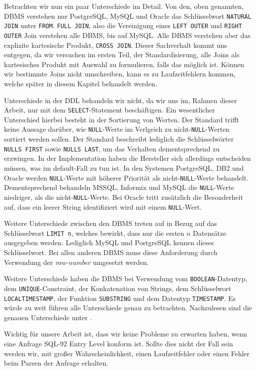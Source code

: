 Betrachten wir nun ein paar Unterschiede im Detail. Von den, oben genannten, DBMS verstehen nur PostgreSQL, MySQL und Oracle das Schlüsselwort \verb|NATURAL JOIN| unter \verb|FROM|. \verb|FULL JOIN|, also die Vereinigung eines \verb|LEFT OUTER| und \verb|RIGHT OUTER| Join verstehen alle DBMS, bis auf MySQL. Alle DBMS verstehen aber das explizite kartesische  Produkt, \verb|CROSS JOIN|. Dieser Sachverhalt kommt uns entgegen, da wir versuchen im ersten Teil, der Standardisierung, alle Joins als kartesisches Produkt mit Auswahl zu formulieren, falls das möglich ist. Können wir bestimmte Joins nicht umschreiben, kann es zu Laufzeitfehlern kommen, welche später in diesem Kapitel behandelt werden.

Unterschiede in der DDL behandeln wir nicht, da wir uns im, Rahmen dieser Arbeit, nur mit dem \verb|SELECT|-Statement beschäftigen. Ein wesentlicher Unterschied hierbei besteht in der Sortierung von Werten. Der Standard trifft keine Aussage darüber, wie \verb|NULL|-Werte im Verlgeich zu nicht-\verb|NULL|-Werten sortiert werden sollen. Der Standard beschreibt lediglich die Schlüsselwörter \verb|NULLS FIRST| sowie \verb|NULLS LAST|, um das Verhalten dementsprechend zu erzwingen. In der Implementation haben die Hersteller sich allerdings entscheiden müssen, was im default-Fall zu tun ist. In den Systemen PostgreSQL, DB2 und Oracle werden \verb|NULL|-Werte mit höherer Priorität als nicht-\verb|NULL|-Werte behandelt. Dementsprechend behandeln MSSQL, Informix und MySQL die \verb|NULL|-Werte niedriger, als die nicht-\verb|NULL|-Werte. Bei Oracle tritt zusätzlich die Besonderheit auf, dass ein leerer String identifiziert wird mit einem \verb|NULL|-Wert.

Weitere Unterschiede zwischen den DBMS treten auf in Bezug auf das Schlüsselwort \verb|LIMIT n|, welches bewirkt, dass nur die ersten $n$ Datensätze ausgegeben werden. Lediglich MySQL und PostgreSQL kennen dieses Schlüsselwort. Bei allen anderen DBMS muss diese Anforderung durch Verwendung der \textit{row-number} umgesetzt werden. 

Weitere Unterschiede haben die DBMS bei Verwendung vom \verb|BOOLEAN|-Datentyp, dem \verb|UNIQUE|-Constraint, der Konkatenation von Strings, dem Schlüsselwort \verb|LOCALTIMESTAMP|, der Funktion \verb|SUBSTRING| und dem Datentyp \verb|TIMESTAMP|. Es würde zu weit führen alle Unterschiede genau zu betrachten. Nachzulesen sind die genauen Unterschiede unter \cite{sqldiff1}.

Wichtig für unsere Arbeit ist, dass wir keine Probleme zu erwarten haben, wenn eine Anfrage SQL-92 Entry Level konform ist. Sollte dies nicht der Fall sein werden wir, mit großer Wahrscheinlichkeit, einen Laufzeitfehler oder einen Fehler beim Parsen der Anfrage erhalten.

